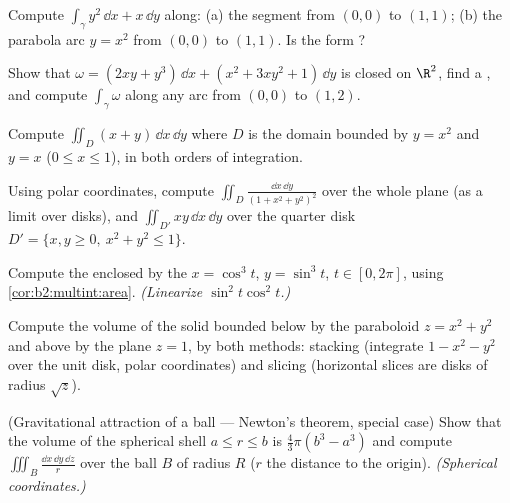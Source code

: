 \begin{exercise}[$\star$]\label{exo:b2:multint:1}
Compute $\int_\gamma y^2\,\dd x + x\,\dd y$ along: (a) the segment
from $(0,0)$ to $(1,1)$; (b) the parabola arc $y = x^2$ from
$(0,0)$ to $(1,1)$. Is the form ?
\end{exercise}

\begin{exercise}[$\star$]\label{exo:b2:multint:2}
Show that $\omega = (2xy + y^3)\,\dd x + (x^2 + 3xy^2 + 1)\,\dd y$
is closed on $\R^2$, find a , and compute
$\int_\gamma\omega$ along any arc from $(0, 0)$ to $(1, 2)$.
\end{exercise}

\begin{exercise}[$\star$]\label{exo:b2:multint:3}
Compute $\iint_D (x + y)\,\dd x\,\dd y$ where $D$ is the domain
bounded by $y = x^2$ and $y = x$ ($0 \leq x \leq 1$), in both
orders of integration.
\end{exercise}

\begin{exercise}[$\star\star$]\label{exo:b2:multint:4}
Using polar coordinates, compute $\iint_D \frac{\dd x\,\dd y}{(1 +
x^2 + y^2)^2}$ over the whole plane (as a limit over disks), and
$\iint_{D'} xy\,\dd x\,\dd y$ over the quarter disk $D' = \{x, y
\geq 0,\ x^2 + y^2 \leq 1\}$.
\end{exercise}

\begin{exercise}[$\star\star$]\label{exo:b2:multint:5}
Compute the  enclosed by the  $x = \cos^3 t$, $y =
\sin^3 t$, $t \in [0, 2\pi]$, using
\cref{cor:b2:multint:area}. \emph{(Linearize $\sin^2 t\cos^2 t$.)}
\end{exercise}

\begin{exercise}[$\star\star$]\label{exo:b2:multint:6}
Compute the volume of the solid bounded below by the paraboloid $z
= x^2 + y^2$ and above by the plane $z = 1$, by both methods:
stacking (integrate $1 - x^2 - y^2$ over the unit disk, polar
coordinates) and slicing (horizontal slices are disks of radius
$\sqrt z$).
\end{exercise}

\begin{exercise}[$\star\star$]\label{exo:b2:multint:7}
(Gravitational attraction of a ball --- Newton's theorem, special
case) Show that the volume of the spherical shell $a \leq r \leq
b$ is $\frac43\pi(b^3 - a^3)$ and compute $\iiint_{B}
\frac{\dd x\,\dd y\,\dd z}{r}$ over the ball $B$ of radius $R$
($r$ the distance to the origin). \emph{(Spherical
coordinates.)}
\end{exercise}

